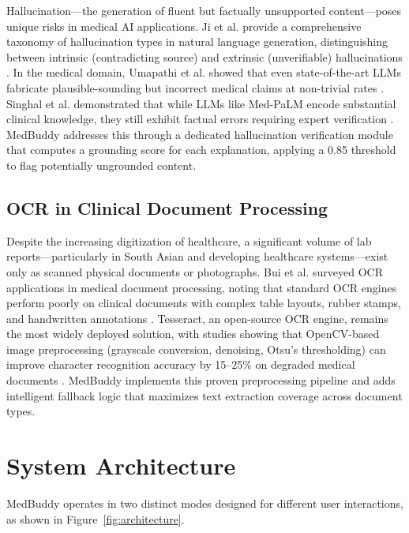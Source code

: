 \documentclass[conference]{IEEEtran}
\begin{document}
Hallucination---the generation of fluent but factually unsupported content---poses unique risks in medical AI applications. Ji et al. provide a comprehensive taxonomy of hallucination types in natural language generation, distinguishing between intrinsic (contradicting source) and extrinsic (unverifiable) hallucinations \cite{ji2023survey}. In the medical domain, Umapathi et al. showed that even state-of-the-art LLMs fabricate plausible-sounding but incorrect medical claims at non-trivial rates \cite{umapathi2023med}. Singhal et al. demonstrated that while LLMs like Med-PaLM encode substantial clinical knowledge, they still exhibit factual errors requiring expert verification \cite{singhal2023large}. MedBuddy addresses this through a dedicated hallucination verification module that computes a grounding score for each explanation, applying a 0.85 threshold to flag potentially ungrounded content.

\subsection{OCR in Clinical Document Processing}

Despite the increasing digitization of healthcare, a significant volume of lab reports---particularly in South Asian and developing healthcare systems---exist only as scanned physical documents or photographs. Bui et al. surveyed OCR applications in medical document processing, noting that standard OCR engines perform poorly on clinical documents with complex table layouts, rubber stamps, and handwritten annotations \cite{bui2024ocr}. Tesseract, an open-source OCR engine, remains the most widely deployed solution, with studies showing that OpenCV-based image preprocessing (grayscale conversion, denoising, Otsu's thresholding) can improve character recognition accuracy by 15--25\% on degraded medical documents \cite{smith2007overview}. MedBuddy implements this proven preprocessing pipeline and adds intelligent fallback logic that maximizes text extraction coverage across document types.

\section{System Architecture}

MedBuddy operates in two distinct modes designed for different user interactions, as shown in Figure~\ref{fig:architecture}.
\end{document}
